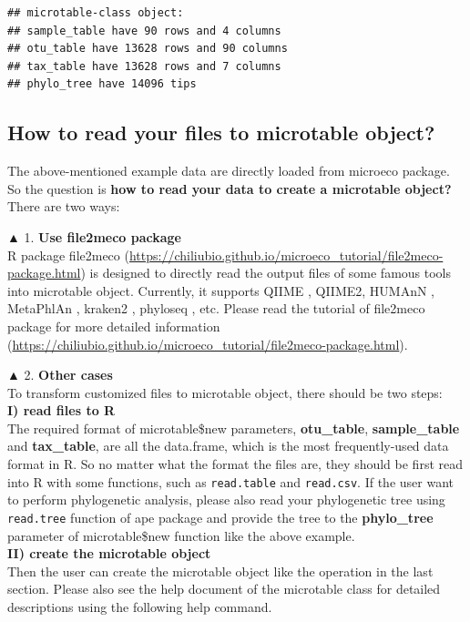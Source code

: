 \documentclass[
]{book}
\begin{document}
\begin{verbatim}
## microtable-class object:
## sample_table have 90 rows and 4 columns
## otu_table have 13628 rows and 90 columns
## tax_table have 13628 rows and 7 columns
## phylo_tree have 14096 tips
\end{verbatim}

\hypertarget{how-to-read-your-files-to-microtable-object}{%
\subsection{How to read your files to microtable object?}\label{how-to-read-your-files-to-microtable-object}}

The above-mentioned example data are directly loaded from microeco package.
So the question is \textbf{how to read your data to create a microtable object?}\\
There are two ways:

▲ 1. \textbf{Use file2meco package}\\
R package file2meco (\url{https://chiliubio.github.io/microeco_tutorial/file2meco-package.html}) is designed to directly read the output files of some famous tools into microtable object.
Currently, it supports QIIME \citep{Caporaso_QIIME_2010}, QIIME2\citep{Bolyen_Reproducible_2019},
HUMAnN \citep{Franzosa_Species_2018}, MetaPhlAn \citep{Truong_MeTApHLaN2_2015}, kraken2 \citep{Wood_Improved_2019}, phyloseq \citep{Mcmurdie_phyloseq_2013}, etc.
Please read the tutorial of file2meco package for more detailed information (\url{https://chiliubio.github.io/microeco_tutorial/file2meco-package.html}).

▲ 2. \textbf{Other cases}\\
To transform customized files to microtable object,
there should be two steps:\\
\textbf{I) read files to R}\\
The required format of microtable\$new parameters, \textbf{otu\_table}, \textbf{sample\_table} and \textbf{tax\_table}, are all the data.frame, which is the most frequently-used data format in R.
So no matter what the format the files are, they should be first read into R with some functions, such as \texttt{read.table} and \texttt{read.csv}.
If the user want to perform phylogenetic analysis, please also read your phylogenetic tree using \texttt{read.tree} function of ape package and
provide the tree to the \textbf{phylo\_tree} parameter of microtable\$new function like the above example.\\
\textbf{II) create the microtable object}\\
Then the user can create the microtable object like the operation in the last section.
Please also see the help document of the microtable class for detailed descriptions using the following help command.
\end{document}
